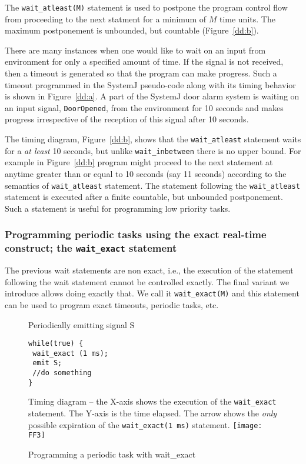 The \texttt{wait\_atleast(M)} statement is used to postpone the program
control flow from proceeding to the next statment for a minimum of $M$
time units. The maximum postponement is unbounded, but countable
(Figure~\ref{dd:b}).

There are many instances when one would like to wait on an input from
environment for only a specified amount of time. If the signal is not
received, then a timeout is generated so that the program can make
progress. Such a timeout programmed in the SystemJ pseudo-code along
with its timing behavior is shown in Figure~\ref{dd:a}. A part of the
SystemJ door alarm system is waiting on an input signal,
\texttt{DoorOpened}, from the environment for 10 seconds and makes
progress irrespective of the reception of this signal after 10 seconds.

The timing diagram, Figure~\ref{dd:b}, shows that the
\texttt{wait\-\_atleast} statement waits for a \textit{at least} 10
seconds, but unlike \texttt{wait\_inbetween} there is no upper bound.
For example in Figure~\ref{dd:b} program might proceed to the next
statement at anytime greater than or equal to 10 seconds (say 11
seconds) according to the semantics of \texttt{wait\_atleast}
statement. The statement following the \texttt{wait\_atleast} statement
is executed after a finite countable, but unbounded postponement. Such a
statement is useful for programming low priority tasks.


\subsubsection{Programming periodic tasks using the exact real-time
  construct; the \texttt{wait\_exact} statement}
\label{sec:progr-using-exact}

The previous wait statements are non exact, i.e., the 
execution of the statement following the wait statement cannot be
controlled exactly. The final variant we introduce allows doing exactly
that. We call it \texttt{wait\_exact(M)} and this statement can be used to
program exact timeouts, periodic tasks, etc.

\begin{figure}[t!]
  \centering
	\vspace{-10pt}
        \begin{SubFloat}{\label{pp:aa}Periodically emitting signal S}
        \begin{lstlisting}[style=sysj,morekeywords={emit,trap,pause,exit,wait_exact}]
while(true) { 
 wait_exact (1 ms); 
 emit S; 
 //do something 
}
\end{lstlisting}
\end{SubFloat}

\begin{SubFloat}{\label{p1:b}Timing diagram -- the X-axis shows the
    execution of the \texttt{wait\_exact} statement. The Y-axis is the
    time elapsed. The arrow shows the \textit{only} possible expiration
    of the \texttt{wait\_exact(1 ms)} statement.}
  \texttt{[image: FF3]}
\end{SubFloat}
  \caption{Programming a periodic task with wait\_exact}
  \label{fig:p1}
  \vspace{-10pt}
\end{figure}

